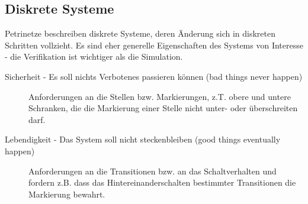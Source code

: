 \documentclass[11pt, fleqn, a4paper, leqno]{scrartcl} %
\begin{document}
	\subsection{Diskrete Systeme}
	Petrinetze beschreiben diskrete Systeme, deren Änderung sich in diskreten Schritten vollzieht. Es sind eher generelle Eigenschaften des Systems von Interesse - die Verifikation ist wichtiger als die Simulation.
	\begin{description}
		\item[Sicherheit - Es soll nichts Verbotenes passieren können (bad things never happen)] Anforderungen an die Stellen bzw. Markierungen, z.T. obere und untere Schranken, die die Markierung einer Stelle nicht unter- oder überschreiten darf.
		\item[Lebendigkeit - Das System soll nicht steckenbleiben (good things eventually happen)] Anforderungen an die Transitionen bzw. an das Schaltverhalten und fordern z.B. dass das Hintereinanderschalten bestimmter Transitionen die Markierung bewahrt.
	\end{description}
\end{document}
